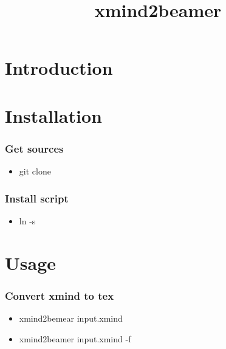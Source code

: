 \documentclass{beamer}
\title{xmind2beamer}
\author{}
\begin{document}
\begin{frame}
    \titlepage
\end{frame}

\note[itemize]{
}


\section{Introduction}
\begin{frame}
    \tableofcontents[currentsection]
\end{frame}

\note{
}

\section{Installation}
\begin{frame}
    \tableofcontents[currentsection]
\end{frame}

\note{
}
\begin{frame}
    \frametitle{Get sources}

    \begin{itemize}[<+->]
        \item{git clone}
    \end{itemize}

\end{frame}

\note{
}
\begin{frame}
    \frametitle{Install script}

    \begin{itemize}[<+->]
        \item{ln -s}
    \end{itemize}

\end{frame}

\note{
}

\section{Usage}
\begin{frame}
    \tableofcontents[currentsection]
\end{frame}

\note{
}
\begin{frame}
    \frametitle{Convert xmind to tex}

    \begin{itemize}[<+->]
        \item{xmind2bemear input.xmind}
    \end{itemize}

    \begin{itemize}[<+->]
        \item{xmind2beamer input.xmind -f}
    \end{itemize}

\end{frame}
\end{document}
